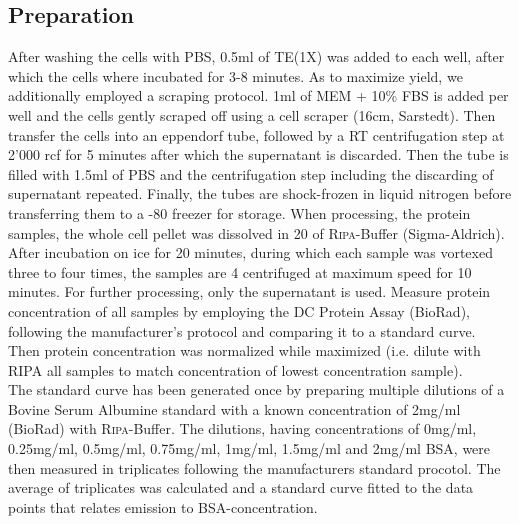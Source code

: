 \subsection{Preparation}
After washing the cells with PBS, 0.5ml of TE(1X) was added to each well, after which the cells where incubated for 3-8 minutes. As to maximize yield, we additionally employed a scraping protocol. 1ml of MEM\textalpha{} + 10\% FBS is added per well and the cells gently scraped off using a cell scraper (16cm, Sarstedt). Then transfer the cells into an eppendorf tube, followed by a RT centrifugation step at 2'000 rcf for 5 minutes after which the supernatant is discarded. Then the tube is filled with 1.5ml of PBS and the centrifugation step including the discarding of supernatant repeated. Finally, the tubes are shock-frozen in liquid nitrogen before transferring them to a -80 \degC freezer for storage. When processing, the protein samples, the whole cell pellet was dissolved in 20\mul{} of \textsc{Ripa}-Buffer (Sigma-Aldrich). After incubation on ice for 20 minutes, during which each sample was vortexed three to four times, the samples are 4 \degC centrifuged at maximum speed for 10 minutes. For further processing, only the supernatant is used. Measure protein concentration of all samples by employing the DC\texttrademark{} Protein Assay (BioRad), following the manufacturer's protocol and comparing it to a standard curve. Then protein concentration was normalized while maximized (i.e. dilute with RIPA all samples to match concentration of lowest concentration sample). \\
The standard curve has been generated once by preparing multiple dilutions of a Bovine Serum Albumine standard with a known concentration of 2mg/ml (BioRad) with \textsc{Ripa}-Buffer. The dilutions, having concentrations of 0mg/ml, 0.25mg/ml, 0.5mg/ml, 0.75mg/ml, 1mg/ml, 1.5mg/ml and 2mg/ml BSA, were then measured in triplicates following the manufacturers standard procotol. The average of triplicates was calculated and a standard curve fitted to the data points that relates emission to BSA-concentration. 

